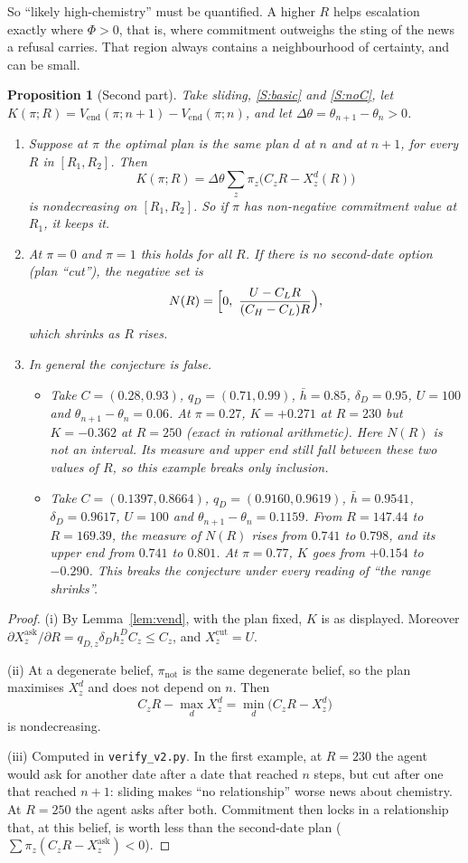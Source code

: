 \documentclass[11pt,a4paper]{article}
\newtheorem{proposition}[theorem]{Proposition}
\theoremstyle{definition}
\theoremstyle{remark}
\newcommand{\Vend}{V_{\mathrm{end}}}
\begin{document}
So ``likely high-chemistry'' must be quantified. A higher $R$ helps escalation exactly where $\Phi>0$, that is, where commitment outweighs the sting of the news a refusal carries. That region always contains a neighbourhood of certainty, and can be small.

\begin{proposition}[Second part]\label{prop:c2b}
Take sliding, \ref{S:basic} and \ref{S:noC}, let $K(\pi;R)=\Vend(\pi;n+1)-\Vend(\pi;n)$, and let $\Delta\theta=\theta_{n+1}-\theta_n>0$.
\begin{enumerate}[label=(\roman*)]
\item Suppose at $\pi$ the optimal plan is the same plan $d$ at $n$ and at $n+1$, for every $R$ in $[R_1,R_2]$. Then
\[
K(\pi;R)=\Delta\theta\sum_z\pi_z\bigl(C_zR-X^d_z(R)\bigr)
\]
is nondecreasing on $[R_1,R_2]$. So if $\pi$ has non-negative commitment value at $R_1$, it keeps it.
\item At $\pi=0$ and $\pi=1$ this holds for all $R$. If there is no second-date option (plan ``cut''), the negative set is
\[
N(R)=\Bigl[0,\ \frac{U-C_LR}{(C_H-C_L)R}\Bigr),
\]
which shrinks as $R$ rises.
\item In general the conjecture is false.
\begin{itemize}[nosep]
\item Take $C=(0.28,0.93)$, $q_D=(0.71,0.99)$, $\bar h=0.85$, $\delta_D=0.95$, $U=100$ and $\theta_{n+1}-\theta_n=0.06$. At $\pi=0.27$, $K=+0.271$ at $R=230$ but $K=-0.362$ at $R=250$ (exact in rational arithmetic). Here $N(R)$ is not an interval. Its measure and upper end still fall between these two values of $R$, so this example breaks only inclusion.
\item Take $C=(0.1397,0.8664)$, $q_D=(0.9160,0.9619)$, $\bar h=0.9541$, $\delta_D=0.9617$, $U=100$ and $\theta_{n+1}-\theta_n=0.1159$. From $R=147.44$ to $R=169.39$, the measure of $N(R)$ rises from $0.741$ to $0.798$, and its upper end from $0.741$ to $0.801$. At $\pi=0.77$, $K$ goes from $+0.154$ to $-0.290$. This breaks the conjecture under every reading of ``the range shrinks''.
\end{itemize}
\end{enumerate}
\end{proposition}

\begin{proof}
(i) By Lemma~\ref{lem:vend}, with the plan fixed, $K$ is as displayed. Moreover $\partial X^{\text{ask}}_z/\partial R=q_{D,z}\delta_Dh^D_zC_z\le C_z$, and $X^{\text{cut}}_z=U$.

(ii) At a degenerate belief, $\pi_{\mathrm{not}}$ is the same degenerate belief, so the plan maximises $X^d_z$ and does not depend on $n$. Then
\[
C_zR-\max_dX^d_z=\min_d\bigl(C_zR-X^d_z\bigr)
\]
is nondecreasing.

(iii) Computed in \texttt{verify\_v2.py}. In the first example, at $R=230$ the agent would ask for another date after a date that reached $n$ steps, but cut after one that reached $n+1$: sliding makes ``no relationship'' worse news about chemistry. At $R=250$ the agent asks after both. Commitment then locks in a relationship that, at this belief, is worth less than the second-date plan ($\sum\pi_z(C_zR-X^{\text{ask}}_z)<0$).
\end{proof}
\end{document}
